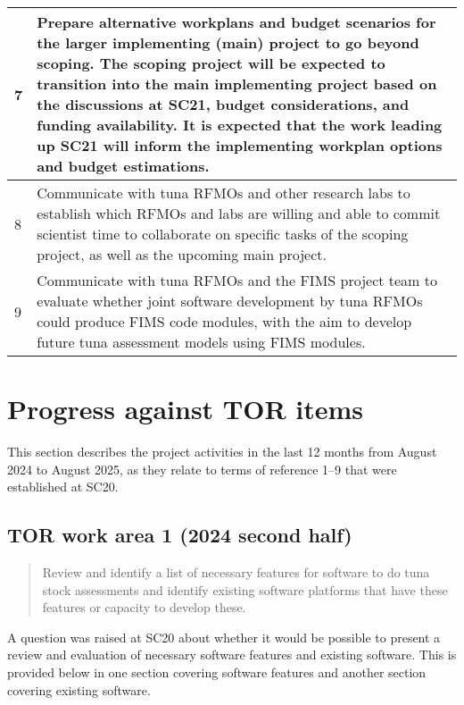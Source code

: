 \documentclass{SCreport}
\begin{document}
\begin{table}
\begin{tabular}{p{1cm}p{13cm}}
    \hline
    7 & Prepare alternative workplans and budget scenarios for the larger
        implementing (main) project to go beyond scoping. The scoping project
        will be expected to transition into the main implementing project based
        on the discussions at SC21, budget considerations, and funding
        availability. It is expected that the work leading up SC21 will inform
        the implementing workplan options and budget estimations.\\
    \hline
    8 & Communicate with tuna RFMOs and other research labs to establish which
        RFMOs and labs are willing and able to commit scientist time to
        collaborate on specific tasks of the scoping project, as well as the
        upcoming main project.\\
    \hline
    9 & Communicate with tuna RFMOs and the FIMS project team to evaluate
        whether joint software development by tuna RFMOs could produce FIMS code
        modules, with the aim to develop future tuna assessment models using
        FIMS modules.\\
    \hline
  \end{tabular}
\end{table}

\clearpage

\section{Progress against TOR items}

This section describes the project activities in the last 12 months from August
2024 to August 2025, as they relate to terms of reference 1--9 that were
established at SC20.

\vspace{1ex}

\subsection{TOR work area 1 (2024 second half)}

\begin{quote}\sf
  Review and identify a list of necessary features for software to do tuna stock
  assessments and identify existing software platforms that have these features
  or capacity to develop these.
\end{quote}

\vspace{2ex}

A question was raised at SC20 about whether it would be possible to present a
review and evaluation of necessary software features and existing software. This
is provided below in one section covering software features and another section
covering existing software.
\end{document}
